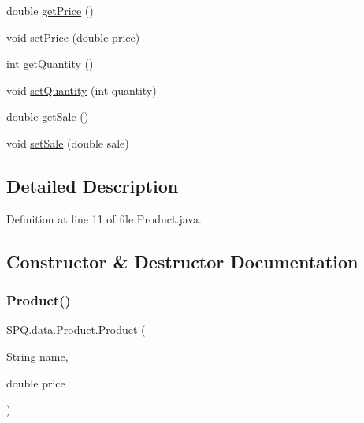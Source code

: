 \begin{DoxyCompactItemize}
\item 
double \mbox{\hyperlink{class_s_p_q_1_1data_1_1_product_ad8200addd74d2e3b6ea9cfff4e8b8c7e}{get\+Price}} ()
\item 
void \mbox{\hyperlink{class_s_p_q_1_1data_1_1_product_a6a12ed828fa7745b6bc8f5f2bc5dd014}{set\+Price}} (double price)
\item 
int \mbox{\hyperlink{class_s_p_q_1_1data_1_1_product_a1bcbc2a00b31563677cea1ab4cb8095c}{get\+Quantity}} ()
\item 
void \mbox{\hyperlink{class_s_p_q_1_1data_1_1_product_a057c7298cb6575a0d709f3fe2bf73ea7}{set\+Quantity}} (int quantity)
\item 
double \mbox{\hyperlink{class_s_p_q_1_1data_1_1_product_a07ba2dea61bb96215609776cc4d7058d}{get\+Sale}} ()
\item 
void \mbox{\hyperlink{class_s_p_q_1_1data_1_1_product_ab7714f5e5a6f1b0a293ad7140c351c3c}{set\+Sale}} (double sale)
\end{DoxyCompactItemize}


\subsection{Detailed Description}


Definition at line 11 of file Product.\+java.



\subsection{Constructor \& Destructor Documentation}
\mbox{\label{class_s_p_q_1_1data_1_1_product_ac5b9fd5a8d446b4d5354f4d35fbd0384}} 
\subsubsection{\texorpdfstring{Product()}{Product()}\hspace{0.1cm}{\footnotesize\ttfamily [1/3]}}
{\footnotesize\ttfamily S\+P\+Q.\+data.\+Product.\+Product (\begin{DoxyParamCaption}\item[{String}]{name,  }\item[{double}]{price }\end{DoxyParamCaption})}



